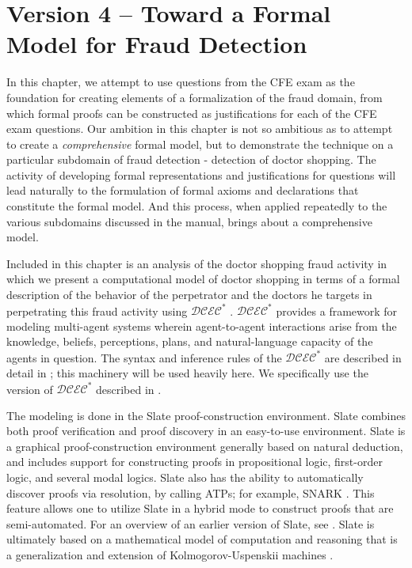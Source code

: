  
\chapter{Version 4 -- Toward a Formal Model for Fraud Detection}

In this chapter, we attempt to use questions from the CFE exam as the foundation for creating elements of a formalization of the fraud domain, from which formal proofs can be constructed as justifications for each of the CFE exam questions.  Our ambition in this chapter is not so ambitious as to attempt to create a \emph{comprehensive} formal model, but to demonstrate the technique on a particular subdomain of fraud detection - detection of doctor shopping.  The activity of developing formal representations and justifications for questions will lead naturally to the formulation of formal axioms and declarations that constitute the formal model.  And this process, when applied repeatedly to the various subdomains discussed in the manual, brings about a comprehensive model.

Included in this chapter is an analysis of the doctor shopping fraud activity in which we present a 
computational model of doctor shopping in terms of a formal description of the behavior of the perpetrator and the doctors he targets in perpetrating this fraud activity using $\mathcal{DCEC}^\ast$ \cite{mgmmm_ptai_sb,ka_sb_scc_seqcalc}.  $\mathcal{DCEC}^\ast$
provides a framework for modeling multi-agent systems wherein
agent-to-agent interactions arise from the knowledge, beliefs,
perceptions, plans, and natural-language capacity of the agents in
question.  The syntax and inference rules of the $\mathcal{DCEC}^\ast$
are described in detail in \cite{mgmmm_ptai_sb,ka_sb_scc_seqcalc};
this machinery will be used heavily here.  We specifically use the
version of $\mathcal{DCEC}^\ast$ described in
\cite{ka_sb_scc_seqcalc}.


The modeling is done in the Slate proof-construction environment.
Slate combines both proof verification and proof discovery in an
easy-to-use environment.  Slate is a graphical proof-construction
environment generally based on natural deduction, and includes support
for constructing proofs in propositional logic, first-order logic, and
several modal logics.  Slate also has the ability to automatically
discover proofs via resolution, by calling ATPs; for example, SNARK
\cite{snarksri}.  This feature allows one to utilize Slate in a hybrid
mode to construct proofs that are semi-automated.  For an overview of
an earlier version of Slate, see \cite{Slate_at_CMNA08}.  Slate is
ultimately based on a mathematical model of computation and reasoning
that is a generalization and extension of Kolmogorov-Uspenskii
machines
\cite{kolmogorov1958definition,bringsjord_sundar_g_unprov_ct}.


